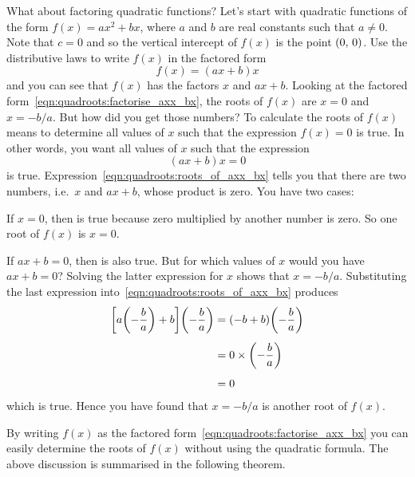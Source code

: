 \documentclass[a4paper,oneside,12pt]{article}
\begin{document}
What about factoring quadratic functions?  Let's start with quadratic
functions of the form $f(x) = ax^2 + bx$, where $a$ and $b$ are real
constants such that $a \neq 0$.  Note that $c = 0$ and so the vertical
intercept of $f(x)$ is the point $\left\lparen{0},\, {0}\right\rparen$.  Use the distributive
laws to write $f(x)$ in the factored form
\begin{equation}
\label{eqn:quadroots:factorise_axx_bx}
f(x)
=
(ax + b)x
\end{equation}
and you can see that $f(x)$ has the factors $x$ and $ax + b$.  Looking
at the factored form~\eqref{eqn:quadroots:factorise_axx_bx}, the roots
of $f(x)$ are $x = 0$ and $x = -b/a$.  But how did you get those
numbers?  To calculate the roots of $f(x)$ means to determine all
values of $x$ such that the expression $f(x) = 0$ is true.  In other
words, you want all values of $x$ such that the expression
\begin{equation}
\label{eqn:quadroots:roots_of_axx_bx}
(ax + b)x
=
0
\end{equation}
is true.  Expression~\eqref{eqn:quadroots:roots_of_axx_bx} tells you
that there are two numbers, i.e.~$x$ and $ax + b$, whose product is
zero.  You have two cases:
\begin{packedenumeral}
\item If $x = 0$, then  is
  true because zero multiplied by another number is zero.  So one root
  of $f(x)$ is $x = 0$.

\item If $ax + b = 0$, then 
  is also true.  But for which values of $x$ would you have
  $ax + b = 0$?  Solving the latter expression for $x$ shows that
  $x = -b / a$.  Substituting the last expression
  into~\eqref{eqn:quadroots:roots_of_axx_bx} produces
  \begin{align*}
  \squarebracket*{
    a \parenthesis*{-\frac{b}{a}}
    +
    b
  }
  \parenthesis*{-\frac{b}{a}}
  &=
  (-b + b)
  \parenthesis*{-\frac{b}{a}} \\[4pt]
  &=
  0 \times \parenthesis*{-\frac{b}{a}} \\[4pt]
  &=
  0
  \end{align*}
  which is true.  Hence you have found that $x = -b / a$ is another
  root of $f(x)$.
\end{packedenumeral}
By writing $f(x)$ as the factored
form~\eqref{eqn:quadroots:factorise_axx_bx} you can easily determine
the roots of $f(x)$ without using the quadratic formula.  The above
discussion is summarised in the following theorem.
\end{document}
